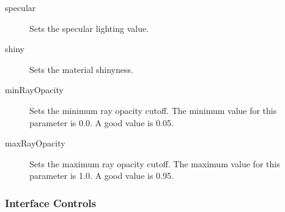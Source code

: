 \begin{description}
\begin{description}
\item [specular]  Sets the specular lighting value.

\item [shiny]  Sets the material shinyness.

\item [minRayOpacity]  Sets the minimum ray opacity cutoff.  The
minimum value for this parameter is 0.0.  A good value is 0.05.

\item [maxRayOpacity]  Sets the maximum ray opacity cutoff.  The
maximum value for this parameter is 1.0.  A good value is 0.95.
\end{description}

\end{description}


\subsubsection{Interface Controls}

